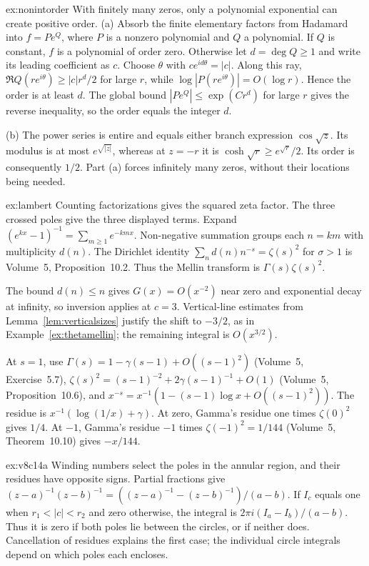 \begin{solution}{ex:nonintorder}
\idea With finitely many zeros, only a polynomial exponential can create positive order.
\writeup (a) Absorb the finite elementary factors from Hadamard into $f=Pe^Q$, where $P$ is a nonzero polynomial and $Q$ a polynomial. If $Q$ is constant, $f$ is a polynomial of order zero. Otherwise let $d=\deg Q\ge1$ and write its leading coefficient as $c$. Choose $\theta$ with $ce^{id\theta}=|c|$. Along this ray, $\Re Q(re^{i\theta})\ge|c|r^d/2$ for large $r$, while $\log|P(re^{i\theta})|=O(\log r)$. Hence the order is at least $d$. The global bound $|Pe^Q|\le\exp(Cr^d)$ for large $r$ gives the reverse inequality, so the order equals the integer $d$.

(b) The power series is entire and equals either branch expression $\cos\sqrt z$. Its modulus is at most $e^{\sqrt{|z|}}$, whereas at $z=-r$ it is $\cosh\sqrt r\ge e^{\sqrt r}/2$. Its order is consequently $1/2$. Part (a) forces infinitely many zeros, without their locations being needed.
\end{solution}
\begin{solution}{ex:lambert}
\idea Counting factorizations gives the squared zeta factor. The three crossed poles give the three displayed terms.
\writeup Expand $(e^{kx}-1)^{-1}=\sum_{m\ge1}e^{-kmx}$. Non-negative summation groups each $n=km$ with multiplicity $d(n)$. The Dirichlet identity $\sum_nd(n)n^{-s}=\zeta(s)^2$ for $\sigma>1$ is Volume~5, Proposition~10.2. Thus the Mellin transform is $\Gamma(s)\zeta(s)^2$.

The bound $d(n)\le n$ gives $G(x)=O(x^{-2})$ near zero and exponential decay at infinity, so inversion applies at $c=3$. Vertical-line estimates from Lemma~\ref{lem:verticalsizes} justify the shift to $-3/2$, as in Example~\ref{ex:thetamellin}; the remaining integral is $O(x^{3/2})$.

At $s=1$, use $\Gamma(s)=1-\gamma(s-1)+O((s-1)^2)$ (Volume~5, Exercise~5.7), $\zeta(s)^2=(s-1)^{-2}+2\gamma(s-1)^{-1}+O(1)$ (Volume~5, Proposition~10.6), and $x^{-s}=x^{-1}(1-(s-1)\log x+O((s-1)^2))$. The residue is $x^{-1}(\log(1/x)+\gamma)$. At zero, Gamma's residue one times $\zeta(0)^2$ gives $1/4$. At $-1$, Gamma's residue $-1$ times $\zeta(-1)^2=1/144$ (Volume~5, Theorem~10.10) gives $-x/144$.
\end{solution}
\begin{solution}{ex:v8c14a}
\idea Winding numbers select the poles in the annular region, and their residues have opposite signs.
\writeup Partial fractions give $(z-a)^{-1}(z-b)^{-1}=((z-a)^{-1}-(z-b)^{-1})/(a-b)$. If $I_c$ equals one when $r_1<|c|<r_2$ and zero otherwise, the integral is $2\pi i(I_a-I_b)/(a-b)$. Thus it is zero if both poles lie between the circles, or if neither does. Cancellation of residues explains the first case; the individual circle integrals depend on which poles each encloses.
\end{solution}
